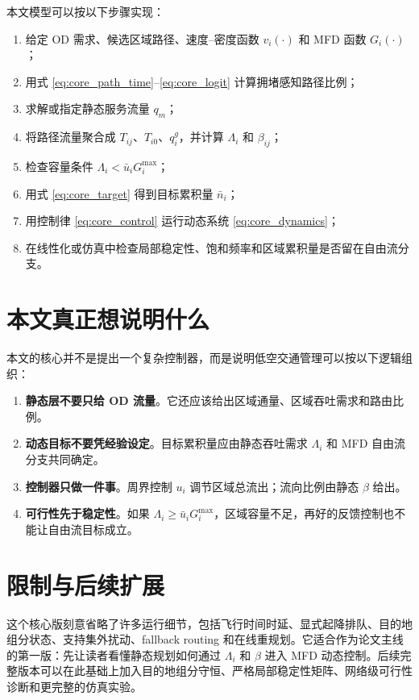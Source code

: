 \documentclass[a4paper,12pt]{article}
\theoremstyle{plain}
\theoremstyle{definition}
\theoremstyle{remark}
\begin{document}
本文模型可以按以下步骤实现：
\begin{enumerate}
    \item 给定 OD 需求、候选区域路径、速度--密度函数 $v_i(\cdot)$ 和 MFD 函数 $G_i(\cdot)$；
    \item 用式 \eqref{eq:core_path_time}--\eqref{eq:core_logit} 计算拥堵感知路径比例；
    \item 求解或指定静态服务流量 $q_m$；
    \item 将路径流量聚合成 $T_{ij}$、$T_{i0}$、$q_i^g$，并计算 $\Lambda_i$ 和 $\beta_{ij}$；
    \item 检查容量条件 $\Lambda_i<\bar u_iG_i^{\max}$；
    \item 用式 \eqref{eq:core_target} 得到目标累积量 $\bar n_i$；
    \item 用控制律 \eqref{eq:core_control} 运行动态系统 \eqref{eq:core_dynamics}；
    \item 在线性化或仿真中检查局部稳定性、饱和频率和区域累积量是否留在自由流分支。
\end{enumerate}

\section{本文真正想说明什么}

本文的核心并不是提出一个复杂控制器，而是说明低空交通管理可以按以下逻辑组织：
\begin{enumerate}
    \item \textbf{静态层不要只给 OD 流量}。它还应该给出区域通量、区域吞吐需求和路由比例。
    \item \textbf{动态目标不要凭经验设定}。目标累积量应由静态吞吐需求 $\Lambda_i$ 和 MFD 自由流分支共同确定。
    \item \textbf{控制器只做一件事}。周界控制 $u_i$ 调节区域总流出；流向比例由静态 $\beta$ 给出。
    \item \textbf{可行性先于稳定性}。如果 $\Lambda_i\ge \bar u_iG_i^{\max}$，区域容量不足，再好的反馈控制也不能让自由流目标成立。
\end{enumerate}

\section{限制与后续扩展}

这个核心版刻意省略了许多运行细节，包括飞行时间时延、显式起降排队、目的地组分状态、支持集外扰动、fallback routing 和在线重规划。它适合作为论文主线的第一版：先让读者看懂静态规划如何通过 $\Lambda_i$ 和 $\beta$ 进入 MFD 动态控制。后续完整版本可以在此基础上加入目的地组分守恒、严格局部稳定性矩阵、网络级可行性诊断和更完整的仿真实验。
\end{document}
